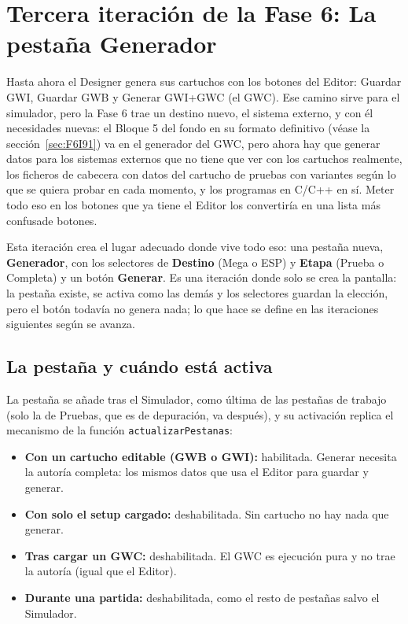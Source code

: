 \section{Tercera iteración de la Fase 6: La pestaña Generador}\label{sec:F6I03}

Hasta ahora el Designer genera sus cartuchos con los botones del Editor: Guardar GWI, Guardar GWB y Generar GWI+GWC (el GWC). Ese camino sirve para el simulador, pero la Fase 6 trae un destino nuevo, el sistema externo, y con él necesidades nuevas: el Bloque 5 del fondo en su formato definitivo (véase la sección~\ref{sec:F6I91}) va en el generador del GWC, pero ahora hay que generar datos para los sistemas externos que no tiene que ver con los cartuchos realmente, los ficheros de cabecera con datos del cartucho de pruebas con variantes según lo que se quiera probar en cada momento, y los programas en C/C++ en sí. Meter todo eso en los botones que ya tiene el Editor los convertiría en una lista más confusade botones.

Esta iteración crea el lugar adecuado donde vive todo eso: una pestaña nueva, \textbf{Generador}, con los selectores de \textbf{Destino} (Mega o ESP) y \textbf{Etapa} (Prueba o Completa) y un botón \textbf{Generar}. Es una iteración donde solo se crea la pantalla: la pestaña existe, se activa como las demás y los selectores guardan la elección, pero el botón todavía no genera nada; lo que hace se define en las iteraciones siguientes según se avanza.

\subsection{La pestaña y cuándo está activa}
\label{sec:F6I03Pestanna}

La pestaña se añade tras el Simulador, como última de las pestañas de trabajo (solo la de Pruebas, que es de depuración, va después), y su activación replica el mecanismo de la función \texttt{actualizarPestanas}:

\begin{itemize}
	\item \textbf{Con un cartucho editable (GWB o GWI):} habilitada. Generar necesita la autoría completa: los mismos datos que usa el Editor para guardar y generar.
	\item \textbf{Con solo el setup cargado:} deshabilitada. Sin cartucho no hay nada que generar.
	\item \textbf{Tras cargar un GWC:} deshabilitada. El GWC es ejecución pura y no trae la autoría (igual que el Editor).
	\item \textbf{Durante una partida:} deshabilitada, como el resto de pestañas salvo el Simulador.
\end{itemize}

